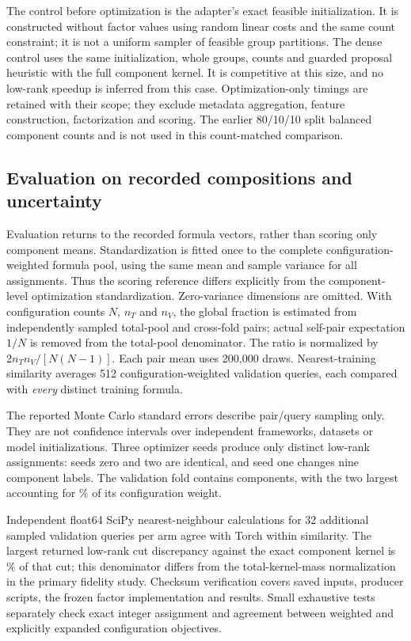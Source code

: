 The control before optimization is the adapter's exact feasible initialization.
It is constructed without factor values using random linear
costs and the same count constraint; it is not a uniform sampler of feasible
group partitions. The dense control uses the same initialization, whole groups,
counts and guarded proposal heuristic with the full component kernel. It is
competitive at this size, and no low-rank speedup is inferred from this case.
Optimization-only timings are retained with their scope; they exclude metadata
aggregation, feature construction, factorization and scoring. The earlier
80/10/10 split balanced component counts and is not used in this count-matched
comparison.

\subsection{Evaluation on recorded compositions and uncertainty}

Evaluation returns to the \ODACFormulas{} recorded formula vectors, rather
than scoring only component means. Standardization is fitted once to the
complete configuration-weighted formula pool, using the same mean and sample
variance for all assignments. Thus the scoring reference differs explicitly
from the component-level optimization standardization. Zero-variance
dimensions are omitted. With configuration counts $N$, $n_T$ and $n_V$, the
global fraction is estimated from independently sampled total-pool and
cross-fold pairs; actual self-pair expectation $1/N$ is removed from the
total-pool denominator. The ratio is normalized by
$2n_Tn_V/[N(N-1)]$. Each pair mean uses 200,000 draws. Nearest-training
similarity averages 512 configuration-weighted validation queries, each
compared with \emph{every} distinct training formula.

The reported Monte Carlo standard errors describe pair/query sampling only.
They are not confidence intervals over independent frameworks, datasets or
model initializations. Three optimizer seeds produce only
\ODACDistinctAssignments{} distinct low-rank assignments: seeds zero and two
are identical, and seed one changes nine component labels. The validation
fold contains \ODACValidationGroups{} components, with the two largest
accounting for \ODACTopTwo\% of its configuration weight.



Independent float64 SciPy nearest-neighbour calculations for 32 additional
sampled validation queries per arm agree with Torch within
\ODACNNCheck{} similarity. The largest returned low-rank cut discrepancy
against the exact component kernel is \ODACCutError\% of that cut; this
denominator differs from the total-kernel-mass normalization in the primary
fidelity study. Checksum verification covers saved inputs, producer scripts,
the frozen factor implementation and results. Small exhaustive tests separately
check exact integer assignment and agreement between weighted and explicitly
expanded configuration objectives.

